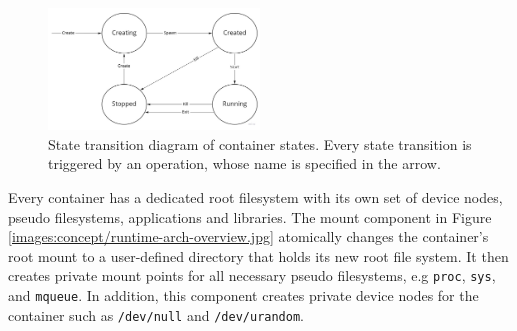 \begin{figure}[H]
    \centering
    \includegraphics[width=0.5\textwidth]{images/concept/container-state-diagram.jpg}
    \caption{State transition diagram of container states. Every state transition is triggered by an operation, whose name is 
    specified in the arrow.}
    \label{images:concept/container-state-diagram.jpg}
\end{figure}


Every container has a dedicated root filesystem with its own set of device nodes,
pseudo filesystems, applications and libraries. The mount component in Figure \ref{images:concept/runtime-arch-overview.jpg}
atomically changes the container's root mount to a user-defined directory that holds its new root file system.
It then creates private mount points for all necessary pseudo filesystems, e.g \verb|proc|, \verb|sys|, and \verb|mqueue|. 
In addition, this component creates private device nodes for the container such as \verb|/dev/null| and \verb|/dev/urandom|.

